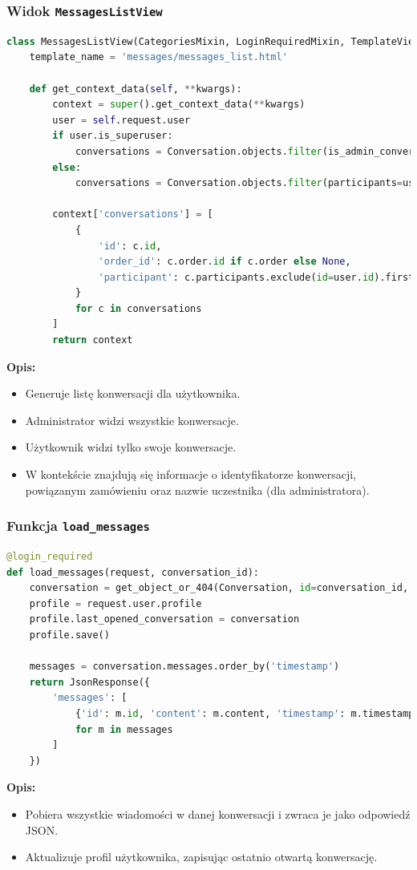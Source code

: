 \documentclass[12pt,a4paper,oneside]{article}
\theoremstyle{definition}
\numberwithin{equation}{section}
\begin{document}
\subsubsection{Widok \texttt{MessagesListView}}
\begin{lstlisting}[language=Python, caption=Kod widoku \texttt{MessagesListView}]
class MessagesListView(CategoriesMixin, LoginRequiredMixin, TemplateView):
    template_name = 'messages/messages_list.html'

    def get_context_data(self, **kwargs):
        context = super().get_context_data(**kwargs)
        user = self.request.user
        if user.is_superuser:
            conversations = Conversation.objects.filter(is_admin_conversation=False)
        else:
            conversations = Conversation.objects.filter(participants=user)

        context['conversations'] = [
            {
                'id': c.id,
                'order_id': c.order.id if c.order else None,
                'participant': c.participants.exclude(id=user.id).first().username if user.is_superuser else None
            }
            for c in conversations
        ]
        return context
\end{lstlisting}
\textbf{Opis:}
\begin{itemize}
    \item Generuje listę konwersacji dla użytkownika.
    \item Administrator widzi wszystkie konwersacje.
    \item Użytkownik widzi tylko swoje konwersacje.
    \item W kontekście znajdują się informacje o identyfikatorze konwersacji, powiązanym zamówieniu oraz nazwie uczestnika (dla administratora).
\end{itemize}




\subsubsection*{Funkcja \texttt{load\_messages}}
\begin{lstlisting}[language=Python, caption=Kod funkcji \texttt{load\_messages}]
@login_required
def load_messages(request, conversation_id):
    conversation = get_object_or_404(Conversation, id=conversation_id, participants=request.user)
    profile = request.user.profile
    profile.last_opened_conversation = conversation
    profile.save()

    messages = conversation.messages.order_by('timestamp')
    return JsonResponse({
        'messages': [
            {'id': m.id, 'content': m.content, 'timestamp': m.timestamp.strftime('%H:%M'), 'sender': m.sender.username}
            for m in messages
        ]
    })
\end{lstlisting}
\textbf{Opis:}
\begin{itemize}
    \item Pobiera wszystkie wiadomości w danej konwersacji i zwraca je jako odpowiedź JSON.
    \item Aktualizuje profil użytkownika, zapisując ostatnio otwartą konwersację.
\end{itemize}
\end{document}
